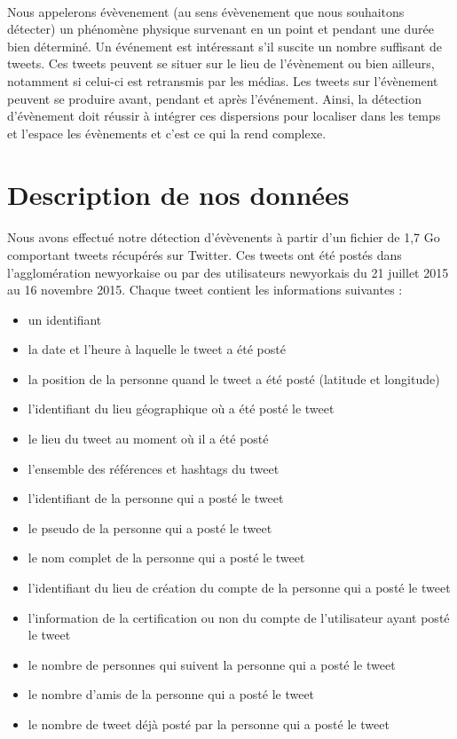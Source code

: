 \documentclass[12pt]{article}
\begin{document}
\paragraph{}
Nous appelerons \'ev\`evenement (au sens \'ev\`evenement que nous souhaitons d\'etecter) un ph\'enom\`ene physique survenant en un point et pendant une dur\'ee bien d\'etermin\'e. Un \'ev\'enement est int\'eressant s'il suscite un nombre suffisant de tweets. Ces tweets peuvent se situer sur le lieu de l'\'ev\`enement ou bien ailleurs, notamment si celui-ci est retransmis par les m\'edias. Les tweets sur l'\'ev\`enement peuvent se produire avant, pendant et apr\`es l'\'ev\'enement. Ainsi, la d\'etection d'\'ev\`enement doit r\'eussir \`a int\'egrer ces dispersions pour localiser dans les temps et l'espace les \'ev\`enements et c'est ce qui la rend complexe.

\section{Description de nos donn\'ees}
\label{sec:desc_donnees}
\paragraph{}
Nous avons effectu\'e notre d\'etection d'\'ev\`evenents \`a partir d'un fichier de 1,7 Go comportant  tweets  r\'ecup\'er\'es sur Twitter. Ces tweets ont \'et\'e post\'es dans l'agglom\'eration newyorkaise ou par des utilisateurs newyorkais du 21 juillet 2015 au 16 novembre 2015. Chaque tweet contient les informations suivantes :
\begin{itemize}
	\item un identifiant
	\item la date et l'heure \`a laquelle le tweet a \'et\'e post\'e
	\item la position de la personne quand le tweet a \'et\'e post\'e (latitude et longitude)
	\item l'identifiant du lieu g\'eographique o\`u a \'et\'e post\'e le tweet
	\item le lieu du tweet au moment o\`u il a \'et\'e post\'e
	\item l'ensemble des r\'ef\'erences et hashtags du tweet
	\item l'identifiant de la personne qui a post\'e le tweet
	\item le pseudo de la personne qui a post\'e le tweet
	\item le nom complet de la personne qui a post\'e le tweet
	\item l'identifiant du lieu de cr\'eation du compte de la personne qui a post\'e le tweet
	\item l'information de la certification ou non du compte de l'utilisateur ayant post\'e le tweet
	\item le nombre de personnes qui suivent la personne qui a post\'e le tweet
	\item le nombre d'amis de la personne qui a post\'e le tweet
	\item le nombre de tweet d\'ej\`a post\'e par la personne qui a post\'e le tweet
\end{itemize}
\end{document}
